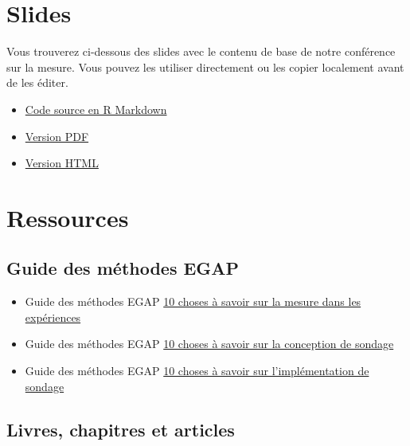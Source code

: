 \documentclass[12pt,]{book}
\begin{document}
\hypertarget{slides-6}{%
\section{Slides}\label{slides-6}}

Vous trouverez ci-dessous des slides avec le contenu de base de notre conférence sur la mesure. Vous pouvez les utiliser directement ou les copier localement avant de les éditer.

\begin{itemize}
\item
  \href{https://egap.github.io/learningdays-resources/Slides_fr/measurement-slides.Rmd}{Code source en R Markdown}
\item
  \href{https://egap.github.io/learningdays-resources/Slides_fr/measurement-slides.pdf}{Version PDF}
\item
  \href{https://egap.github.io/learningdays-resources/Slides_fr/measurement-slides.html}{Version HTML}
\end{itemize}

\hypertarget{ressources-6}{%
\section{Ressources}\label{ressources-6}}

\hypertarget{guide-des-muxe9thodes-egap-6}{%
\subsection{Guide des méthodes EGAP}\label{guide-des-muxe9thodes-egap-6}}

\begin{itemize}
\item
  Guide des méthodes EGAP \href{https://egap.org/resource/10-things-to-know-about-measurement-in-experiments/}{10 choses à savoir sur la mesure dans les expériences}
\item
  Guide des méthodes EGAP \href{https://egap.org/resource/10-things-to-know-about-survey-design/}{10 choses à savoir sur la conception de sondage}
\item
  Guide des méthodes EGAP \href{https://egap.org/resource/10-things-to-know-about-survey-implementation/}{10 choses à savoir sur l'implémentation de sondage}
\end{itemize}

\hypertarget{livres-chapitres-et-articles-4}{%
\subsection{Livres, chapitres et articles}\label{livres-chapitres-et-articles-4}}
\end{document}
